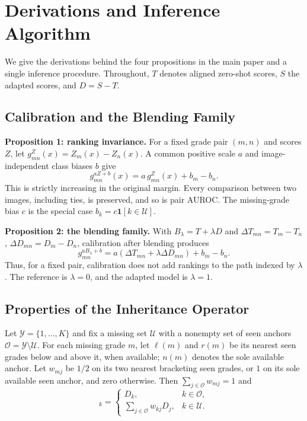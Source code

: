 \section{Derivations and Inference Algorithm}
\label{sec:supp_derivations}

We give the derivations behind the four propositions in the main paper and a single inference procedure. Throughout, $T$ denotes aligned zero-shot scores, $S$ the adapted scores, and $D=S-T$.

\subsection{Calibration and the Blending Family}
\label{sec:supp_calibration_proofs}

\noindent\textbf{Proposition 1: ranking invariance.}
For a fixed grade pair $(m,n)$ and scores $Z$, let $g^Z_{mn}(x)=Z_m(x)-Z_n(x)$.
A common positive scale $a$ and image-independent class biases $b$ give
\begin{equation}
 g^{aZ+b}_{mn}(x)=a\,g^Z_{mn}(x)+b_m-b_n.
 \label{eq:supp_affine_margin}
\end{equation}
This is strictly increasing in the original margin. Every comparison between two images, including ties, is preserved, and so is pair AUROC. The missing-grade bias $c$ is the special case $b_k=c\mathbf1[k\in\mathcal U]$.

\noindent\textbf{Proposition 2: the blending family.}
With $B_\lambda=T+\lambda D$ and $\Delta T_{mn}=T_m-T_n$, $\Delta D_{mn}=D_m-D_n$, calibration after blending produces
\begin{equation}
 g^{aB_\lambda+b}_{mn}
 =a(\Delta T_{mn}+\lambda\Delta D_{mn})+b_m-b_n.
 \label{eq:supp_blend_margin}
\end{equation}
Thus, for a fixed pair, calibration does not add rankings to the path indexed by $\lambda$. The reference is $\lambda=0$, and the adapted model is $\lambda=1$.

\subsection{Properties of the Inheritance Operator}
\label{sec:supp_operator_proofs}

Let $\mathcal Y=\{1,\ldots,K\}$ and fix a missing set $\mathcal U$ with a nonempty set of seen anchors $\mathcal O=\mathcal Y\setminus\mathcal U$. For each missing grade $m$, let $\ell(m)$ and $r(m)$ be its nearest seen grades below and above it, when available; $n(m)$ denotes the sole available anchor. Let $w_{mj}$ be $1/2$ on its two nearest bracketing seen grades, or $1$ on its sole available seen anchor, and zero otherwise. Then $\sum_{j\in\mathcal O}w_{mj}=1$ and
\begin{equation}
[\mathcal L_{\mathcal U}(D)]_k=
\begin{cases}
 D_k,&k\in\mathcal O,\\
 \sum_{j\in\mathcal O}w_{kj}D_j,&k\in\mathcal U.
\end{cases}
\label{eq:supp_operator_linear}
\end{equation}

